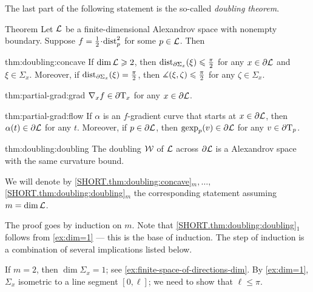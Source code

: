 The last part of the following statement is the so-called \emph{doubling theorem}.

\begin{thm}{Theorem}\label{thm:doubling}
Let $\mathcal{L}$ be a finite-dimensional Alexandrov space with nonempty boundary.
Suppose $f\z=\tfrac12\cdot\distfun_p^2$ for some $p\in \mathcal{L}$.
Then

\begin{subthm}{thm:doubling:concave}
If $\operatorname{\rm dim}\nolimits \mathcal{L}\geqslant 2$, then
$\mathrm{dist}_{\partial \Sigma_x}(\xi)\leqslant \tfrac\pi2$ for any $x\in\partial \mathcal{L}$ and $\xi\in \Sigma_x$.
Moreover, if $\mathrm{dist}_{\partial \Sigma_x}(\xi)= \tfrac\pi2$, then $\measuredangle(\xi,\zeta)\leqslant\tfrac\pi2$ for any $\zeta\in \Sigma_x$. 
\end{subthm}

\begin{subthm}{thm:partial-grad:grad}
$\nabla_xf\in \partial\mathrm{T}_x$ for any $x\in\partial \mathcal{L}$.
\end{subthm}

\begin{subthm}{thm:partial-grad:flow}
If $\alpha$ is an $f$-gradient curve that starts at $x\in \partial \mathcal{L}$, then $\alpha(t)\in \partial \mathcal{L}$ for any $t$.
Moreover, if $p\in \partial \mathcal{L}$, then $\operatorname{\rm gexp}\nolimits_p(v)\in \partial \mathcal{L}$ for any $v\in\partial\mathrm{T}_p$.
\end{subthm}

\begin{subthm}{thm:doubling:doubling}
The doubling $\mathcal{W}$ of $\mathcal{L}$ across $\partial \mathcal{L}$ is a Alexandrov space with the same curvature bound.
\end{subthm}

\end{thm}

We will denote by 
\ref{SHORT.thm:doubling:concave}$_m,\dots,$\ref{SHORT.thm:doubling:doubling}$_m$ the corresponding statement assuming $m=\operatorname{\rm dim}\nolimits\mathcal{L}$.

The proof goes by induction on $m$.
Note that \ref{SHORT.thm:doubling:doubling}$_1$ follows from \ref{ex:dim=1} --- this is the base of induction.
The step of induction is a combination of several implications listed below.

If $m=2$, then $\dim\Sigma_x=1$; see \ref{ex:finite-space-of-directions-dim}.
By \ref{ex:dim=1}, $\Sigma_x$ isometric to a line segment $[0,\ell]$;
we need to show that $\ell\le\pi$.

